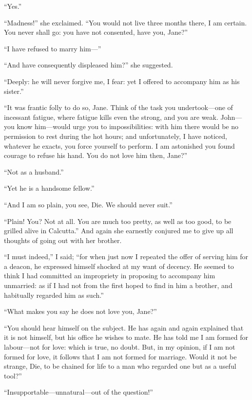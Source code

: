 \enquote{Yes.}

\enquote{Madness!} she exclaimed. \enquote{You would not live three
months there, I am certain. You never shall go: you have not consented,
have you, Jane?}

\enquote{I have refused to marry him---}

\enquote{And have consequently displeased him?} she suggested.

\enquote{Deeply: he will never forgive me, I fear: yet I offered to
accompany him as his sister.}

\enquote{It was frantic folly to do so, Jane. Think of the task you
undertook---one of incessant fatigue, where fatigue kills even the
strong, and you are weak. \St{} John---you know him---would urge you to
impossibilities: with him there would be no permission to rest during
the hot hours; and unfortunately, I have noticed, whatever he exacts,
you force yourself to perform. I am astonished you found courage to
refuse his hand. You do not love him then, Jane?}

\enquote{Not as a husband.}

\enquote{Yet he is a handsome fellow.}

\enquote{And I am so plain, you see, Die. We should never suit.}

\enquote{Plain! You? Not at all. You are much too pretty, as well as
too good, to be grilled alive in Calcutta.} And again she earnestly
conjured me to give up all thoughts of going out with her brother.

\enquote{I must indeed,} I said; \enquote{for when just now I repeated
the offer of serving him for a deacon, he expressed himself shocked at
my want of decency. He seemed to think I had committed an impropriety
in proposing to accompany him unmarried: as if I had not from the first
hoped to find in him a brother, and habitually regarded him as such.}

\enquote{What makes you say he does not love you, Jane?}

\enquote{You should hear himself on the subject. He has again and again
explained that it is not himself, but his office he wishes to mate. He
has told me I am formed for labour---not for love: which is true, no
doubt. But, in my opinion, if I am not formed for love, it follows that
I am not formed for marriage. Would it not be strange, Die, to be
chained for life to a man who regarded one but as a useful tool?}

\enquote{Insupportable---unnatural---out of the question!}

